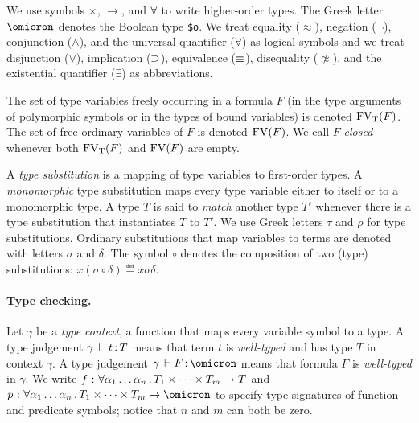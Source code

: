 We use symbols ${\times}$, ${\to}$, and ${\forall}$
to write higher-order types. The Greek letter $\omicron$ denotes
the Boolean type {\tt \$o}. We treat equality ($\approx$),
negation ($\lnot$), conjunction ($\land$), and the universal
quantifier ($\forall$) as logical symbols and we treat
disjunction ($\lor$), implication ($\supset$), equivalence
($\equiv$), disequality ($\not\approx$), and the existential
quantifier ($\exists$) as abbreviations.

The set of type variables freely occurring in a formula $F$
(in the type arguments of polymorphic symbols or
in the types of bound variables) is denoted $\mathrm{FV}_\mathrm{T}(F)$.
The set of free ordinary variables of $F$
is denoted $\mathrm{FV}(F)$. We call $F$ {\em closed\/}
whenever both $\mathrm{FV}_\mathrm{T}(F)$ and $\mathrm{FV}(F)$ are empty.

A {\em type substitution\/} is a mapping of type variables
to first-order types. A {\em monomorphic\/} type substitution
maps every type variable either to itself or to a monomorphic type.
%
A type $T$ is said to {\em match\/} another type $T'$ whenever
there is a type substitution that instantiates $T$ to $T'$.
We use Greek letters $\tau$ and $\rho$ for type substitutions.
%
Ordinary substitutions that map variables to terms
are denoted with letters $\sigma$ and $\delta$.
The symbol $\circ$ denotes the composition
of two (type) substitutions:
$x(\sigma \circ \delta) \eqdef x\sigma\delta$.

\paragraph{Type checking.}
Let $\gamma$ be a {\em type context}, a function that maps
every variable symbol to a type.
A type judgement $\gamma \,\vdash t \operatorname{:} T$ means that term $t$
is {\em well-typed\/} and has type $T$ in context $\gamma$.
A type judgement $\gamma \,\vdash F \ty \omicron$ means that formula $F$
is {\em well-typed\/} in $\gamma$.
We write $f \,\operatorname{:}\, \forall \alpha_1\dots\alpha_n \,.\,
T_1 \times \dots \times T_m \to T$ and
$p \,\ty\, \forall \alpha_1\dots\alpha_n \,.\,
T_1 \times \dots \times T_m \to \omicron$ to specify
type signatures of function and predicate symbols;
notice that $n$ and $m$ can both be zero.

